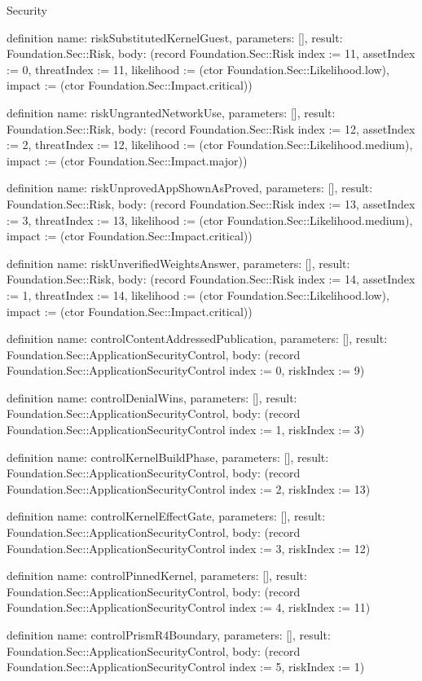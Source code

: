\begin{lexlean}{Security}
\begin{semanticmodule}
definition{
  name: riskSubstitutedKernelGuest,
  parameters: [],
  result: Foundation.Sec::Risk,
  body: (record Foundation.Sec::Risk {index := 11, assetIndex := 0, threatIndex := 11, likelihood := (ctor Foundation.Sec::Likelihood.low), impact := (ctor Foundation.Sec::Impact.critical)})
}

definition{
  name: riskUngrantedNetworkUse,
  parameters: [],
  result: Foundation.Sec::Risk,
  body: (record Foundation.Sec::Risk {index := 12, assetIndex := 2, threatIndex := 12, likelihood := (ctor Foundation.Sec::Likelihood.medium), impact := (ctor Foundation.Sec::Impact.major)})
}

definition{
  name: riskUnprovedAppShownAsProved,
  parameters: [],
  result: Foundation.Sec::Risk,
  body: (record Foundation.Sec::Risk {index := 13, assetIndex := 3, threatIndex := 13, likelihood := (ctor Foundation.Sec::Likelihood.medium), impact := (ctor Foundation.Sec::Impact.critical)})
}

definition{
  name: riskUnverifiedWeightsAnswer,
  parameters: [],
  result: Foundation.Sec::Risk,
  body: (record Foundation.Sec::Risk {index := 14, assetIndex := 1, threatIndex := 14, likelihood := (ctor Foundation.Sec::Likelihood.low), impact := (ctor Foundation.Sec::Impact.critical)})
}

definition{
  name: controlContentAddressedPublication,
  parameters: [],
  result: Foundation.Sec::ApplicationSecurityControl,
  body: (record Foundation.Sec::ApplicationSecurityControl {index := 0, riskIndex := 9})
}

definition{
  name: controlDenialWins,
  parameters: [],
  result: Foundation.Sec::ApplicationSecurityControl,
  body: (record Foundation.Sec::ApplicationSecurityControl {index := 1, riskIndex := 3})
}

definition{
  name: controlKernelBuildPhase,
  parameters: [],
  result: Foundation.Sec::ApplicationSecurityControl,
  body: (record Foundation.Sec::ApplicationSecurityControl {index := 2, riskIndex := 13})
}

definition{
  name: controlKernelEffectGate,
  parameters: [],
  result: Foundation.Sec::ApplicationSecurityControl,
  body: (record Foundation.Sec::ApplicationSecurityControl {index := 3, riskIndex := 12})
}

definition{
  name: controlPinnedKernel,
  parameters: [],
  result: Foundation.Sec::ApplicationSecurityControl,
  body: (record Foundation.Sec::ApplicationSecurityControl {index := 4, riskIndex := 11})
}

definition{
  name: controlPrismR4Boundary,
  parameters: [],
  result: Foundation.Sec::ApplicationSecurityControl,
  body: (record Foundation.Sec::ApplicationSecurityControl {index := 5, riskIndex := 1})
}


\end{semanticmodule}
\end{lexlean}
